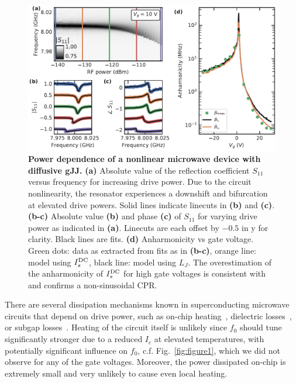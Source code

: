 \begin{figure}[t]
	\centering
	\includegraphics[width=\linewidth]{chapter-gJJ-CPR/figs/Figure4}
	\caption{
		\textbf{Power dependence of a nonlinear microwave device with diffusive gJJ.}
		\textbf{(a)} Absolute value of the reflection coefficient $S_{11}$ versus frequency for increasing drive power.
		Due to the circuit nonlinearity, the resonator experiences a downshift and bifurcation at elevated drive powers.
		Solid lines indicate linecuts in \textbf{(b)} and \textbf{(c)}.
		\textbf{(b-c)} Absolute value \textbf{(b)} and phase \textbf{(c)} of $S_{11}$ for varying drive power as indicated in \textbf{(a)}.
		Linecuts are each offset by $-0.5$ in y for clarity.
		Black lines are fits.
		\textbf{(d)} Anharmonicity vs gate voltage.
		Green dots: data as extracted from fits as in \textbf{(b-c)}, orange line: model using $I_s^{\rm DC}$, black line: model using $L_J$.
		The overestimation of the anharmonicity of $I_s^{\rm DC}$ for high gate voltages is consistent with and confirms a non-sinusoidal CPR.
	}
	\label{fig:figure4}
\end{figure}

There are several dissipation mechanisms known in superconducting microwave circuits that depend on drive power, such as on-chip heating~\cite{portisPowerinducedSwitchingHTS1991,heinFundamentalLimitsLinear1997,wosikPowerHandlingCapabilities1997}, dielectric losses~\cite{martinisDecoherenceJosephsonQubits2005c,oconnellMicrowaveDielectricLoss2008a,gunnarssonDielectricLossesMultilayer2013,lisenfeldElectricFieldSpectroscopy2019}, or subgap losses~\cite{dassonnevilleDissipationSupercurrentFluctuations2013,ferrierPhasedependentAndreevSpectrum2013,dassonnevilleCoherenceenhancedPhasedependentDissipation2018}.
%
Heating of the circuit itself is unlikely since $f_0$ should tune significantly stronger due to a reduced $I_c$ at elevated temperatures, with potentially significant influence on $f_0$, c.f. Fig.~\ref{fig:figure1}, which we did not observe for any of the gate voltages.
%
Moreover, the power dissipated on-chip is extremely small and very unlikely to cause even local heating.

